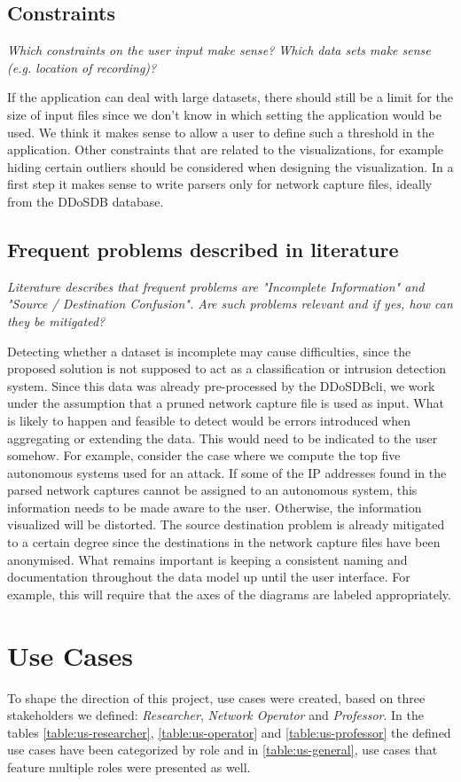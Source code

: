     \subsection{Constraints} 
\textit{Which constraints on the user input make sense? Which data sets make sense (e.g. location of recording)?
}

If the application can deal with large datasets, there should still be a limit for the size of input files since we don't know in which setting the application would be used. We think it makes sense to allow a user to define such a threshold in the application. Other constraints that are related to the visualizations, for example hiding certain outliers should be considered when designing the visualization.
In a first step it makes sense to write parsers only for network capture files, ideally from the DDoSDB database.
    
    \subsection{Frequent problems described in literature} 
    \textit{Literature describes that frequent problems are "Incomplete Information" and "Source / Destination Confusion". Are such problems relevant and if yes, how can they be mitigated?}
    
    Detecting whether a dataset is incomplete may cause difficulties, since the proposed solution is not supposed to act as a classification or intrusion detection system. Since this data was already pre-processed by the DDoSDB\-cli, we  work under the assumption that a pruned network capture file is used as input. 
    What is likely to happen and feasible to detect would be errors introduced when aggregating or extending the data. This would need to be indicated to the user somehow. For example, consider the case where we compute the top five autonomous systems used for an attack. If some of the IP addresses found in the parsed network captures cannot be assigned to an autonomous system, this information needs to be made aware to the user. Otherwise, the information visualized will be distorted.
    The source destination problem is already mitigated to a certain degree since the destinations in the network capture files have been anonymised. What remains important is keeping a consistent naming and documentation throughout the data model up until the user interface. For example, this will require that the axes of the diagrams are labeled appropriately.
    
\section{Use Cases}
\label{sec:usecases}
To shape the direction of this project, use cases were created, based on three stakeholders we defined: \emph{Researcher}, \emph{Network Operator} and \emph{Professor}. In the tables \ref{table:us-researcher}, \ref{table:us-operator} and \ref{table:us-professor} the defined use cases have been categorized by role and in \ref{table:us-general}, use cases that feature multiple roles were presented as well.


